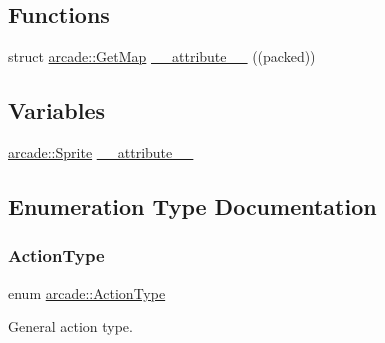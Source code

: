 \subsection*{Functions}
\begin{DoxyCompactItemize}
\item 
struct \hyperlink{structarcade_1_1_get_map}{arcade\+::\+Get\+Map} \hyperlink{namespacearcade_a09ff62ff66b3d7e845d329683e977d9a}{\+\_\+\+\_\+attribute\+\_\+\+\_\+} ((packed))
\end{DoxyCompactItemize}
\subsection*{Variables}
\begin{DoxyCompactItemize}
\item 
\hyperlink{classarcade_1_1_sprite}{arcade\+::\+Sprite} \hyperlink{namespacearcade_ae0cdeb3398b5a1f9385b6f19de1466c4}{\+\_\+\+\_\+attribute\+\_\+\+\_\+}
\end{DoxyCompactItemize}


\subsection{Enumeration Type Documentation}
\mbox{\label{namespacearcade_a1b6c05b243c7e94d71fb328705e619bd}} 
\subsubsection{\texorpdfstring{Action\+Type}{ActionType}}
{\footnotesize\ttfamily enum \hyperlink{namespacearcade_a1b6c05b243c7e94d71fb328705e619bd}{arcade\+::\+Action\+Type}}



General action type. 

